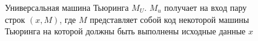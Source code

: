 \begin{figure}
\centering



\caption{Универсальная машина Тьюринга $M_U$. $M_u$ получает на вход
  пару строк $\left(x, M\right)$, где $M$ представляет собой код
  некоторой машины Тьюринга на которой должны быть выполнены исходные
  данные $x$} 
\label{figAddAlgoUTuring}
\end{figure}
